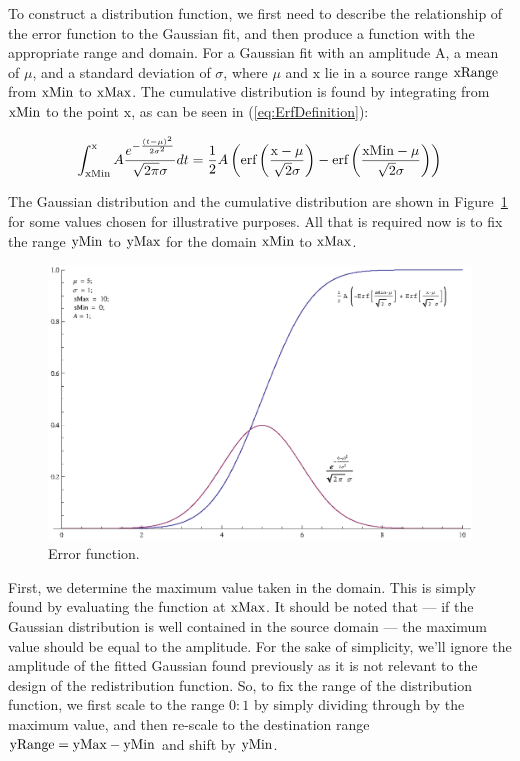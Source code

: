 To construct a distribution function, we first need to describe the relationship of the error function to the Gaussian fit, and then produce a function with the appropriate range and domain. For a Gaussian fit with an amplitude A, a mean of $\mu$, and a standard deviation of $\sigma$, where $\mu$ and $\text{x}$ lie in a source range $\text{xRange}$ from $\text{xMin}$ to $\text{xMax}$. The cumulative distribution is found by integrating from $\text{xMin}$ to the point $\text{x}$, as can be seen in (\ref{eq:ErfDefinition}):

\begin{equation}\label{eq:ErfDefinition}
  \int _{\text{xMin}}^{\text{x}} A \frac{e^{-\frac{(t-\mu )^2}{2 \sigma ^2}}}{\sqrt{2 \pi } \sigma }dt = 
  \frac{1}{2} A \left(\text{erf}\left(\frac{\text{x}-\mu }{\sqrt{2} \sigma }\right)-\text{erf}\left(\frac{\text{xMin}-\mu }{\sqrt{2} \sigma }\right)\right)
\end{equation}

The Gaussian distribution and the cumulative distribution are shown in Figure~\ref{fig:ErrorFunctionGraph} for some values chosen for illustrative purposes. All that is required now is to fix the range $\text{yMin}$ to $\text{yMax}$ for the domain $\text{xMin}$ to $\text{xMax}$.

\begin{figure}[h!]
  \caption{Error function.}  \label{fig:ErrorFunctionGraph}
  \centering
    \includegraphics[width=\textwidth]{Chapter2/Figs/errorFunction.eps}
\end{figure}

First, we determine the maximum value taken in the domain. This is simply found by evaluating the function at $\text{xMax}$. It should be noted that --- if the Gaussian distribution is well contained in the source domain --- the maximum value should be equal to the amplitude. For the sake of simplicity, we'll ignore the amplitude of the fitted Gaussian found previously as it is not relevant to the design of the redistribution function. So, to fix the range of the distribution function, we first scale to the range $0:1$ by simply dividing through by the maximum value, and then re-scale to the destination range $\text{yRange} = \text{yMax} - \text{yMin}$ and shift by $\text{yMin}$.


